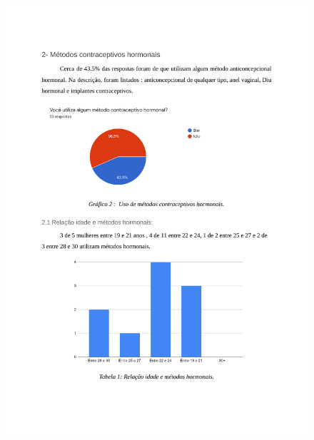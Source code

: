 \begin{apendicesenv}
        \begin{figure}[ht]
            \centering
            \includegraphics[keepaspectratio=true,scale=0.7]{figuras/Tab2.pdf}
        \end{figure}
        

\end{apendicesenv}

